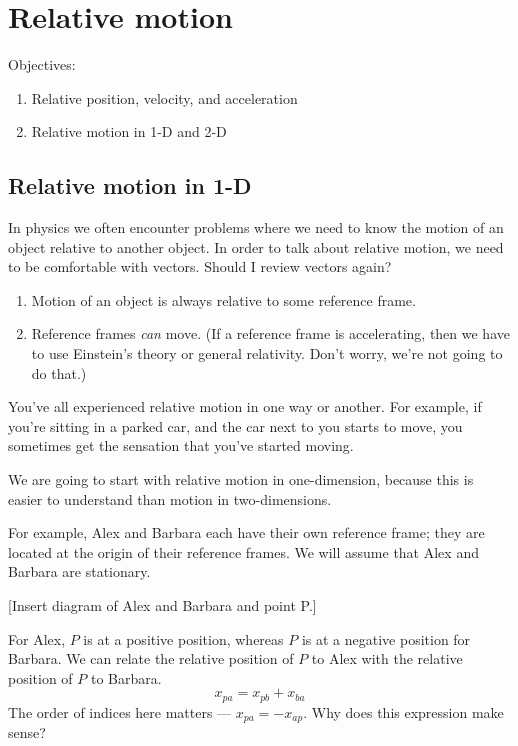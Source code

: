 \section{Relative motion}
Objectives:
\begin{enumerate}
\item Relative position, velocity, and acceleration
\item Relative motion in 1-D and 2-D
\end{enumerate}

\subsection{Relative motion in 1-D}
In physics we often encounter problems where we need to know the motion of an object relative to another object. In order to talk about relative motion, we need to be comfortable with vectors. Should I review vectors again?

\begin{enumerate}
\item Motion of an object is always relative to some reference frame. 
\item Reference frames \textit{can} move. (If a reference frame is accelerating, then we have to use Einstein's theory or general relativity. Don't worry, we're not going to do that.)
\end{enumerate}

You've all experienced relative motion in one way or another. For example, if you're sitting in a parked car, and the car next to you starts to move, you sometimes get the sensation that you've started moving.

We are going to start with relative motion in one-dimension, because this is easier to understand than motion in two-dimensions.

For example, Alex and Barbara each have their own reference frame; they are located at the origin of their reference frames. We will assume that Alex and Barbara are stationary.

[Insert diagram of Alex and Barbara and point P.]
\vspace{4cm}


For Alex, $P$ is at a positive position, whereas $P$ is at a negative position for Barbara. We can relate the relative position of $P$ to Alex with the relative position of $P$ to Barbara.
$$x_{pa}=x_{pb}+x_{ba}$$
The order of indices here matters --- $x_{pa}=-x_{ap}$. Why does this expression make sense?

